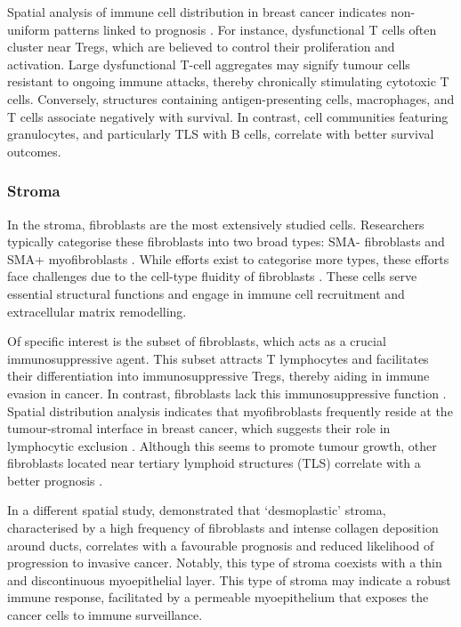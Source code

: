 Spatial analysis of immune cell distribution in breast cancer indicates non-uniform patterns linked to prognosis \parencite{Danenberg2022-zb, Wang2023-bo}. For instance, dysfunctional T cells often cluster near Tregs, which are believed to control their proliferation and activation. Large dysfunctional T-cell aggregates may signify tumour cells resistant to ongoing immune attacks, thereby chronically stimulating cytotoxic T cells. Conversely, structures containing antigen-presenting cells, macrophages, and T cells associate negatively with survival. In contrast, cell communities featuring granulocytes, and particularly \acf{TLS} with B cells, correlate with better survival outcomes.

\subsubsection*{Stroma}

In the stroma, fibroblasts are the most extensively studied cells. Researchers typically categorise these fibroblasts into two broad types: SMA- fibroblasts and SMA+ myofibroblasts \parencite{Costa2018-ir}. While efforts exist to categorise more types, these efforts face challenges due to the cell-type fluidity of fibroblasts \parencite{Cords2023-og,Wu2021-uq}. These cells serve essential structural functions and engage in immune cell recruitment and extracellular matrix remodelling.

Of specific interest is the   subset of fibroblasts, which acts as a crucial immunosuppressive agent. This subset attracts T lymphocytes and facilitates their differentiation into immunosuppressive Tregs, thereby aiding in immune evasion in cancer. In contrast,   fibroblasts lack this immunosuppressive function \parencite{Costa2018-ir}. Spatial distribution analysis indicates that myofibroblasts frequently reside at the tumour-stromal interface in breast cancer, which suggests their role in lymphocytic exclusion \parencite{Danenberg2022-zb}. Although this seems to promote tumour growth, other fibroblasts located near tertiary lymphoid structures (TLS) correlate with a better prognosis \parencite{Danenberg2022-zb, Cords2023-og} . 

In a different spatial study, \textcite{Risom2022-uw} demonstrated that `desmoplastic' stroma, characterised by a high frequency of fibroblasts and intense collagen deposition around ducts, correlates with a favourable prognosis and reduced likelihood of progression to invasive cancer. Notably, this type of stroma coexists with a thin and discontinuous myoepithelial layer. This type of stroma may indicate a robust immune response, facilitated by a permeable myoepithelium that exposes the cancer cells to immune surveillance.

